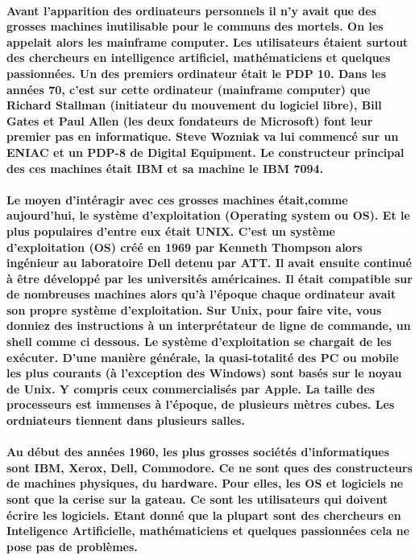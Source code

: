 \paragraph{
  Avant l'apparition des ordinateurs personnels il n'y avait que des grosses machines inutilisable pour le communs des mortels. On les appelait alors les mainframe computer. Les utilisateurs étaient surtout des chercheurs en intelligence artificiel, mathématiciens et quelques passionnées. Un des premiers ordinateur était le PDP 10. Dans les années 70, c'est sur cette ordinateur (mainframe computer) que  Richard Stallman (initiateur du mouvement du logiciel libre), Bill Gates et Paul Allen (les deux fondateurs de Microsoft) font leur premier pas en informatique. Steve Wozniak va lui commencé sur un ENIAC et un PDP-8 de Digital Equipment. Le constructeur principal des ces machines était IBM et sa machine le IBM 7094.
}

\paragraph{
  Le moyen d'intéragir avec ces grosses machines était,comme aujourd'hui, le système d'exploitation (Operating system ou OS). Et le plus populaires d'entre eux était UNIX. C'est un système d'exploitation (OS) créé en 1969 par Kenneth Thompson alors ingénieur au laboratoire Dell detenu par ATT. Il avait ensuite continué à être développé par les universités américaines. Il était compatible sur de nombreuses machines alors qu'à l'époque chaque ordinateur avait son propre système d'exploitation. Sur Unix, pour faire vite, vous donniez des instructions à un interprétateur de ligne de commande, un shell comme ci dessous. Le système d'exploitation se chargait de les exécuter. D'une manière générale, la quasi-totalité des PC ou mobile les plus courants (à l'exception des Windows) sont basés sur le noyau de Unix. Y compris ceux commercialisés par Apple. La taille des processeurs est immenses à l'époque, de plusieurs mètres cubes. Les ordniateurs tiennent dans plusieurs salles.
}

\paragraph{
  Au début des années 1960, les plus grosses sociétés d'informatiques sont IBM, Xerox, Dell, Commodore. Ce ne sont ques des constructeurs de machines physiques, du hardware. Pour elles, les OS et logiciels ne sont que la cerise sur la gateau. Ce sont les utilisateurs qui doivent écrire les logiciels. Etant donné que la plupart sont des chercheurs en Inteligence Artificielle, mathématiciens et quelques passionnées cela ne pose pas de problèmes.
}

